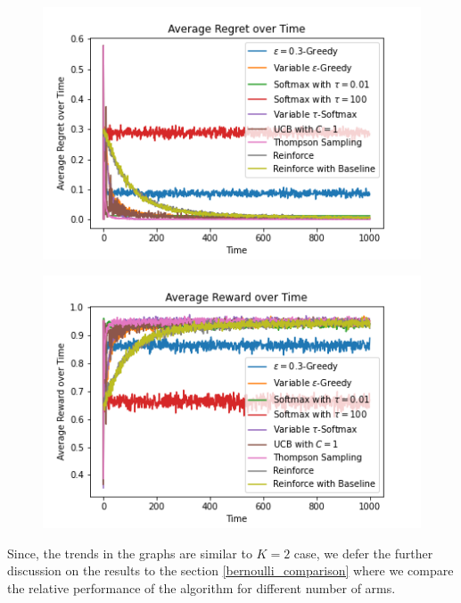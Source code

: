 \documentclass{article}
\begin{document}
			\begin{figure}[H]
			\graphicspath{ {../Experiments/Bernoulli_5_every_case/} }
			\centering
			\begin{minipage}{.5\textwidth}
			  \centering
			  \includegraphics[width=\linewidth]{Average_Regret_over_Time.png}
			  \label{fig:test1}
			\end{minipage}%
			\begin{minipage}{.5\textwidth}
			  \centering
			  \includegraphics[width=\linewidth]{Average_Reward_over_Time.png}
			  \label{fig:test2}
			\end{minipage}
			\end{figure}
		
		Since, the trends in the graphs are similar to $K=2$ case, we defer the further discussion on the results to the section \ref{bernoulli_comparison}  where we compare
		the relative performance of the algorithm for different number of arms.
\end{document}
